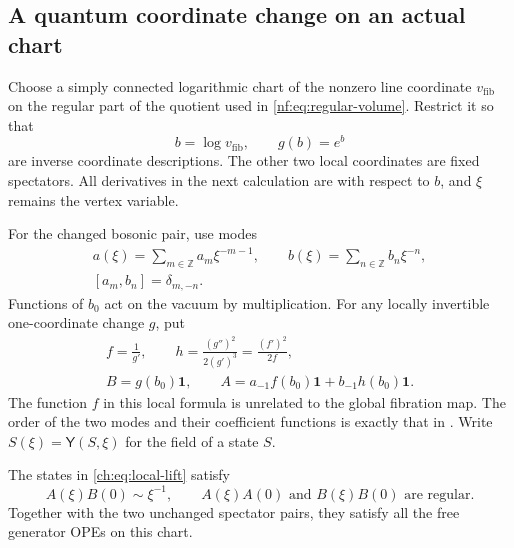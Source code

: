 \subsection{A quantum coordinate change on an actual chart}

Choose a simply connected logarithmic chart of the nonzero line
coordinate $v_{\mathrm{fib}}$ on the regular part of the quotient
used in \eqref{nf:eq:regular-volume}.
Restrict it so that
\[
                  b=\log v_{\mathrm{fib}},\qquad g(b)=e^b
\]
are inverse coordinate descriptions. The other two local
coordinates are fixed spectators.
All derivatives in the next calculation are with respect to $b$,
and $\xi$ remains the vertex variable.

For the changed bosonic pair, use modes
\begin{equation}\label{ch:eq:modes}
 \begin{gathered}
 a(\xi)=\sum_{m\in\mathbb Z}a_m\xi^{-m-1},\qquad
 b(\xi)=\sum_{n\in\mathbb Z}b_n\xi^{-n},\\
                         [a_m,b_n]=\delta_{m,-n}.
 \end{gathered}
\end{equation}
Functions of $b_0$ act on the vacuum by multiplication.
For any locally invertible one-coordinate change $g$, put
\begin{equation}\label{ch:eq:local-lift}
 \begin{gathered}
 f=\frac1{g'},\qquad
 h=\frac{(g'')^2}{2(g')^3}=\frac{(f')^2}{2f},\\
 B=g(b_0)\mathbf1,\qquad
 A=a_{-1}f(b_0)\mathbf1+b_{-1}h(b_0)\mathbf1.
 \end{gathered}
\end{equation}
The function $f$ in this local formula is unrelated to the
global fibration map.
The order of the two modes and their coefficient functions is
exactly that in \cite[equations~(6.2) and~(9.3)]{GMSGerbes}.
Write $S(\xi)=\mathsf Y(S,\xi)$ for the field of a state $S$.

\begin{proposition}\label{ch:prop:local-OPE}
The states in \eqref{ch:eq:local-lift} satisfy
\[
       A(\xi)B(0)\sim\xi^{-1},\qquad
       A(\xi)A(0)\text{ and }B(\xi)B(0)\text{ are regular}.
\]
Together with the two unchanged spectator pairs, they satisfy
all the free generator OPEs on this chart.
\end{proposition}

